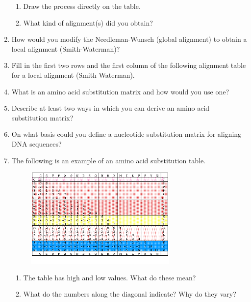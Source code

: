 \documentclass[11pt]{article}
\begin{document}
\begin{enumerate}
\begin{figure}[H]
  \end{figure}
  \begin{enumerate}
  \item Draw the process directly on the table.
  \item What kind of alignment(s) did you obtain?
  \end{enumerate}
\item How would you modify the Needleman-Wunsch (global alignment) to
  obtain a local alignment (Smith-Waterman)?
\item Fill in the first two rows and the first column of the following
  alignment table for a local alignment (Smith-Waterman).
  \begin{figure}[H]
    \begin{tikzpicture}[scale=0.6]
      
    \end{tikzpicture}
  \end{figure}
\item What is an amino acid substitution matrix and how would you use one?
\item Describe at least two ways in which you can derive an amino acid
  substitution matrix?
\item On what basis could you define a nucleotide substitution matrix for
  aligning DNA sequences?
\item The following is an example of an amino acid substitution table.
  \begin{figure}[H]
    \includegraphics[width=0.7\textwidth]{images/dayhoff_256}
  \end{figure}
  \begin{enumerate}
  \item The table has high and low values. What do these mean?
  \item What do the numbers along the diagonal indicate? Why do they
    vary?
  \end{enumerate}
\end{enumerate}
  
\end{document}
